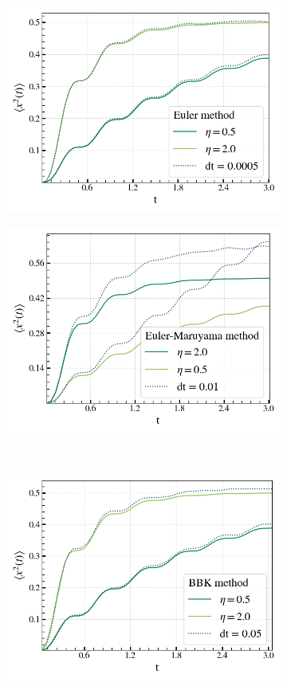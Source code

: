 	\begin{figure}[tb]
		\begin{subfigure}{0.5\textwidth}
			\centering
			\includegraphics[width=0.95\linewidth]{graphics/HO-Euler-0.0005.png}
		\end{subfigure}
		\begin{subfigure}{0.5\textwidth}
			\centering
			\includegraphics[width=0.95\linewidth]{graphics/HO-Euler-0.01.png}
		\end{subfigure}  \\
		\begin{subfigure}{0.5\textwidth}
			\centering
			\includegraphics[width=0.95\linewidth]{graphics/HO-BBK-0.05.png}

\end{subfigure}
\end{figure}
